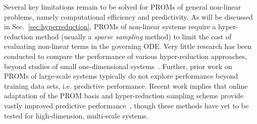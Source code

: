 Several key limitations remain to be solved for PROMs of general non-linear problems, namely computational efficiency and predictivity. As will be discussed in Sec.~\ref{sec:hyperreduction}, PROMs of non-linear systems require a hyper-reduction method (usually a \textit{sparse sampling} method) to limit the cost of evaluating non-linear terms in the governing ODE. Very little research has been conducted to compare the performance of various hyper-reduction approaches, beyond studies of small one-dimensional systems~\cite{Peherstorfer2020}. Further, prior work on PROMs of large-scale systems typically do not explore performance beyond training data sets, i.e. predictive performance. Recent work implies that online adaptation of the PROM basis and hyper-reduction sampling scheme provide vastly improved predictive performance~\cite{Peherstorfer2022,WayneIsaacTanUy2022}, though these methods have yet to be tested for high-dimension, multi-scale systems.
